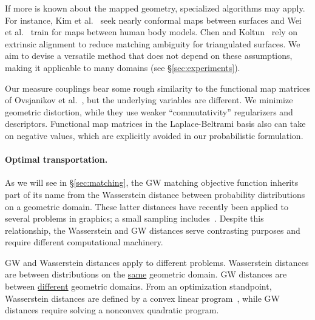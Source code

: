 If more is known about the mapped geometry, specialized algorithms may apply.  For instance, Kim et al.~ seek nearly conformal maps between surfaces and Wei et al.~ train for maps between human body models.  Chen and Koltun~ rely on extrinsic alignment to reduce matching ambiguity for triangulated surfaces.  We aim to devise a versatile method that does not depend on these assumptions, making it applicable to many domains (see \S\ref{sec:experiments}).

Our measure couplings bear some rough similarity to the functional map matrices of Ovsjanikov et al.~, but the underlying variables are different.  We minimize geometric distortion, while they use weaker ``commutativity'' regularizers and descriptors.  Functional map matrices in the Laplace-Beltrami basis also can take on negative values, which are explicitly avoided in our probabilistic formulation.

\paragraph*{Optimal transportation.}  As we will see in \S\ref{sec:matching}, the GW matching objective function inherits part of its name from the Wasserstein distance between probability distributions on a geometric domain.  These latter distances have recently been applied to several problems in graphics; a small sampling includes~\cite{bonneel-2011,degoes-2011,merigot-2011,deGoes-2012,schwartzburg-2014,solomon-2014,deGoes-2015,solomon-2015}. Despite this relationship, the Wasserstein and GW distances serve contrasting purposes and require different computational machinery.


GW and Wasserstein distances apply to different problems.  Wasserstein distances are between distributions on the \underline{same} geometric domain.  GW distances are between \underline{different} geometric domains.  From an optimization standpoint, Wasserstein distances are defined by a convex linear program~\cite{villani-2003,rubner-2000}, while GW distances require solving a nonconvex quadratic program. %

